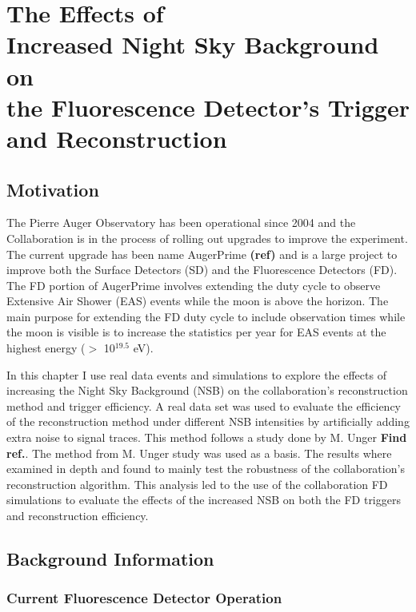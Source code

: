 \chapter[The Effects of Increased NSB on the FD Trigger and Reconstruction]{\centering The Effects of \\ Increased Night Sky Background on \\ the Fluorescence Detector's Trigger and Reconstruction \\ }\label{Ch:SelectEff}

\section{Motivation}

The Pierre Auger Observatory has been operational since 2004 and the Collaboration is in the process of rolling out upgrades to improve the experiment. The current upgrade has been name AugerPrime \textbf{(ref)} and is a large project to improve both the Surface Detectors (SD) and the Fluorescence Detectors (FD). The FD portion of AugerPrime involves extending the duty cycle to observe Extensive Air Shower (EAS) events while the moon is above the horizon. The main purpose for extending the FD duty cycle to include observation times while the moon is visible is to increase the statistics per year for EAS events at the highest energy ($>$ 10$^{19.5}$ eV). 

In this chapter I use real data events and simulations to explore the effects of increasing the Night Sky Background (NSB) on the collaboration's reconstruction method and trigger efficiency. A real data set was used to evaluate the efficiency of the reconstruction method under different NSB intensities by artificially adding extra noise to signal traces. This method follows a study done by M. Unger \textbf{Find ref.}. The method from M. Unger study was used as a basis. The results where examined in depth and found to mainly test the robustness of the collaboration's reconstruction algorithm. This analysis led to the use of the collaboration FD simulations to evaluate the effects of the increased NSB on both the FD triggers and reconstruction efficiency.

\section{Background Information}

\subsection{Current Fluorescence Detector Operation}

